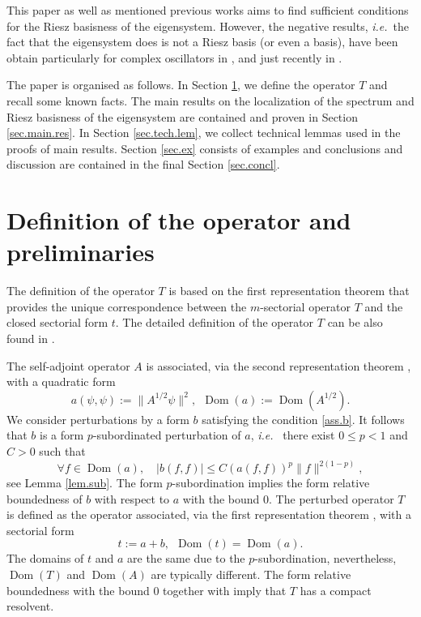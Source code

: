 This paper as well as mentioned previous works aims to find sufficient conditions for the Riesz basisness of the eigensystem. However, the negative results, {{\emph{i.e.}}}~the fact that the eigensystem does is not a Riesz basis (or even a basis), have been obtain particularly for complex oscillators in \cite{Davies-1999-200, Davies-2000-32, Davies-2004-70, Henry-2013}, and just recently in \cite{Mityagin-2013-prep}.

The paper is organised as follows. In Section \ref{sec.op.def}, we define the operator $T$ and recall some known facts. The main results on the localization of the spectrum and Riesz basisness of the eigensystem are contained and proven in Section \ref{sec.main.res}. In Section \ref{sec.tech.lem}, we collect technical lemmas used in the proofs of main results. Section \ref{sec.ex} consists of examples and conclusions and discussion are contained in the final Section \ref{sec.concl}.

\section{Definition of the operator and preliminaries}
\label{sec.op.def}

The definition of the operator $T$ is based on the first representation theorem \cite[Thm.VI.2.1]{Kato-1966} that provides the unique correspondence between the $m$-sectorial operator $T$ and the closed sectorial form $t$.
The detailed definition of the operator $T$ can be also found in \cite[Sec.2.]{Agranovich-1994-28}.

The self-adjoint operator $A$ is associated, via the second representation theorem \cite[Thm.VI.2.23]{Kato-1966}, with a quadratic form 
\begin{equation*}
a(\psi,\psi)  := \|A^{1/2} \psi\|^2, \ \ 
{{\operatorname{Dom}}}(a)  := {{\operatorname{Dom}}}(A^{1/2}).
\end{equation*}
We consider perturbations by a form $b$ satisfying the condition \eqref{ass.b}.
It follows that $b$ is a form $p$-subordinated perturbation of $a$, {{\emph{i.e.}}}~ 
there exist $0 \leq p<1$ and $C>0$ such that  
\begin{equation}\label{form.p.sub}
\forall f \in {{\operatorname{Dom}}}(a), \quad |b(f,f)| \leq C \left( a(f,f) \right )^p \|f\|^{2(1-p)},
\end{equation}
see Lemma \ref{lem.sub}. The form $p$-subordination implies the form relative boundedness of $b$ with respect to $a$ with the bound $0$. 
The perturbed operator $T$ is defined as the operator associated, via the first representation theorem \cite[Thm.VI.2.1]{Kato-1966}, with a sectorial form
\begin{equation*}
t:= a + b,  \ \ 
{{\operatorname{Dom}}}(t)  = {{\operatorname{Dom}}}(a).
\end{equation*}
The domains of $t$ and $a$ are the same due to the $p$-subordination, nevertheless, ${{\operatorname{Dom}}}(T)$ and ${{\operatorname{Dom}}}(A)$ are typically different. 
The form relative boundedness with the bound 0 together with \cite[Thm.VI.3.4]{Kato-1966} imply that $T$ has a compact resolvent. 

